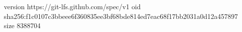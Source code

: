 version https://git-lfs.github.com/spec/v1
oid sha256:f1c0107c3bbeee6f360835ee3bf68bde814ed7eac68f17bb2031a0d12a457897
size 8388704
